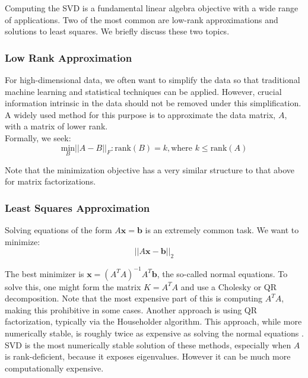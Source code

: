 \documentclass{article}
\begin{document}
Computing the SVD is a fundamental linear algebra objective with a wide range of applications. Two of the most common are low-rank approximations and solutions to least squares. We briefly discuss these two topics.

\subsubsection{Low Rank Approximation}

For high-dimensional data, we often want to simplify the data so that traditional machine learning and statistical techniques can be applied. However, crucial information intrinsic in the data should not be removed under this simplification. A widely used method for this purpose is to approximate the data matrix, $A$, with a matrix of lower rank.
\\

Formally, we seek:
\begin{equation}
\underset{B}{\text{min}}||A-B||_{F}: \text{rank}(B) = k, \text{where } k\leq \text{rank}(A)
\end{equation}

Note that the minimization objective has a very similar structure to that above for matrix factorizations.

\subsubsection{Least Squares Approximation}

Solving equations of the form $A\textbf{x}=\textbf{b}$ is an extremely common task. We want to minimize:
\begin{equation}
||A\textbf{x}-\textbf{b}||_{2}
\end{equation}

The best minimizer is $\textbf{x} = (A^{T}A)^{-1}A^{T}\textbf{b}$, the so-called normal equations. To solve this, one might form the matrix $K = A^{T}A$ and use a Cholesky or QR decomposition. Note that the most expensive part of this is computing $A^{T}A$, making this prohibitive in some cases. Another approach is using QR factorization, typically via the Householder algorithm. This approach, while more numerically stable, is roughly twice as expensive as solving the normal equations \cite{lsq}.
\\

SVD is the most numerically stable solution of these methods, especially when $A$ is rank-deficient, because it exposes eigenvalues. However it can be much more computationally expensive.\\
\end{document}
